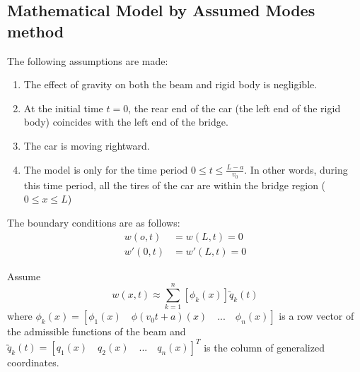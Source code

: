 \documentclass[11pt, oneside]{article}   	%
\begin{document}
 \subsection{Mathematical Model by Assumed Modes method}
The following assumptions are made:
\begin{enumerate}
 \item The effect of gravity on both the beam and rigid body is negligible.
 \item At the initial time $t = 0$, the rear end of the car (the left end of the rigid body) coincides with the left end of the bridge.
 \item The car is moving rightward.
 \item The model is only for the time period $0 \leq t \leq \frac{L-a}{v_0}$. In other words, during this time period, all the tires of the car are within the bridge region ($0 \leq x \leq L$)
\end{enumerate}
The boundary conditions are as follows:
\begin{align*}
w(o,t) &= w(L,t) = 0 \\
w'(0,t) &= w'(L,t) = 0
\end{align*}

Assume $$ w(x,t) \approx \sum_{k=1}^n [\phi_k(x)] \utilde{q}_k(t)$$
where $\phi_k(x) = [\phi_1(x) \quad \phi(v_0t+a)(x) \quad . . . \quad \phi_n(x)]$ is a row vector of the admissible functions of the beam and $\utilde{q}_k(t) = [q_1(x) \quad q_2(x) \quad . . . \quad q_n(x)]^T$ is the column of generalized coordinates.
\end{document}
